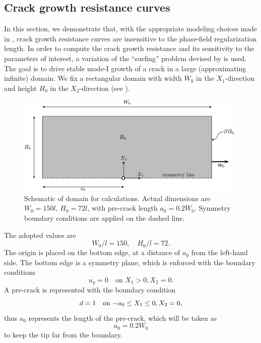 \subsection{Crack growth resistance curves}

In this section, we demonstrate that, with the appropriate modeling choices made in , crack growth resistance curves are insensitive to the phase-field regularization length. In order to compute the crack growth resistance and its sensitivity to the parameters of interest, a variation of the ``surfing'' problem devised by \cite{hossain_effective_2014,brandon2020cohesive} is used.
The goal is to drive stable mode-I growth of a crack in a large (approximating infinite) domain.
We fix a rectangular domain with width $W_0$ in the $X_1$-direction and height $H_0$ in the $X_2$-direction (see ).
\begin{figure}[!htb]
  \centering
  \includegraphics[width=11cm]{Chapter5/figures/JR/domain.png}
  \caption[Schematic of the domain for J-R curve calculations. ]{Schematic of domain for calculations. Actual dimensions are $W_0 = 150 l$, $H_0 = 72 l$, with pre-crack length $a_0 = 0.2 W_0$. Symmetry boundary conditions are applied on the dashed line.}
  \label{fig:domain}
\end{figure}
The adopted values are
\begin{equation}
  \label{eq:domain_size}
  W_0 / l = 150, \quad H_0 / l = 72.
\end{equation}
The origin is placed on the bottom edge, at a distance of $a_0$ from the left-hand side.
The bottom edge is a symmetry plane, which is enforced with the boundary conditions
\begin{equation}
  u_y = 0 \quad \text{on $X_1 > 0, X_2 = 0$}.
\end{equation}
A pre-crack is represented with the boundary condition
\begin{equation}
  \label{eq:phase_bc}
  d = 1 \quad \text{on $ -a_0 \leq X_1 \leq 0, X_2 = 0$},
\end{equation}
thus $a_0$ represents the length of the pre-crack, which will be taken as
\begin{equation}
  \label{eq:pre_crack_length}
  a_0 = 0.2 W_0
\end{equation}
to keep the tip far from the boundary.

